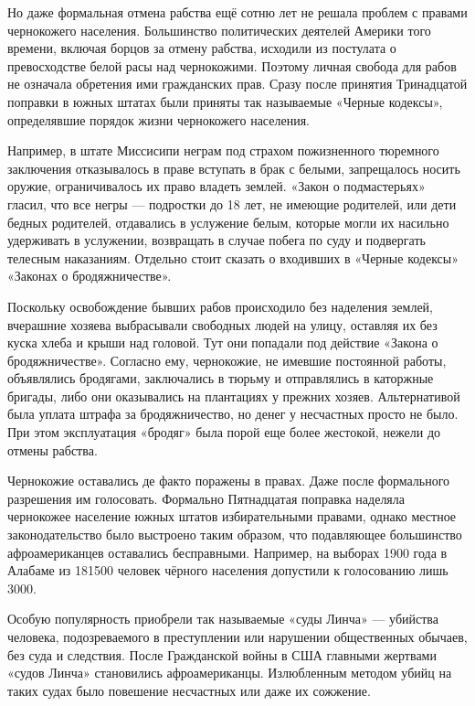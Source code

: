 Но даже формальная отмена рабства ещё сотню лет не решала проблем с правами
чернокожего населения. Большинство политических деятелей Америки того времени,
включая борцов за отмену рабства, исходили из постулата о превосходстве белой
расы над чернокожими. Поэтому личная свобода для рабов не означала обретения
ими гражданских прав. Сразу после принятия Тринадцатой поправки в южных штатах
были приняты так называемые «Черные кодексы», определявшие порядок жизни
чернокожего населения.

Например, в штате Миссисипи неграм под страхом пожизненного тюремного
заключения отказывалось в праве вступать в брак с белыми, запрещалось носить
оружие, ограничивалось их право владеть землей. «Закон о подмастерьях» гласил,
что все негры — подростки до 18 лет, не имеющие родителей, или дети бедных
родителей, отдавались в услужение белым, которые могли их насильно удерживать в
услужении, возвращать в случае побега по суду и подвергать телесным наказаниям.
Отдельно стоит сказать о входивших в «Черные кодексы» «Законах о
бродяжничестве».

Поскольку освобождение бывших рабов происходило без наделения землей, вчерашние
хозяева выбрасывали свободных людей на улицу, оставляя их без куска хлеба и
крыши над головой. Тут они попадали под действие «Закона о бродяжничестве».
Согласно ему, чернокожие, не имевшие постоянной работы, объявлялись бродягами,
заключались в тюрьму и отправлялись в каторжные бригады, либо они оказывались
на плантациях у прежних хозяев. Альтернативой была уплата штрафа за
бродяжничество, но денег у несчастных просто не было. При этом эксплуатация
«бродяг» была порой еще более жестокой, нежели до отмены рабства.

Чернокожие оставались де факто поражены в правах. Даже после формального
разрешения им голосовать. Формально Пятнадцатая поправка наделяла чернокожее
население южных штатов избирательными правами, однако местное законодательство
было выстроено таким образом, что подавляющее большинство афроамериканцев
оставались бесправными. Например, на выборах 1900 года в Алабаме из 181500
человек чёрного населения допустили к голосованию лишь 3000.

Особую популярность приобрели так называемые «суды Линча» — убийства человека,
подозреваемого в преступлении или нарушении общественных обычаев, без суда и
следствия. После Гражданской войны в США главными жертвами «судов Линча»
становились афроамериканцы. Излюбленным методом убийц на таких судах было
повешение несчастных или даже их сожжение.

